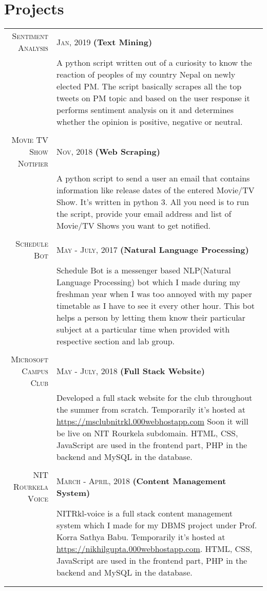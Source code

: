 \documentclass[a4paper,10pt]{article}
\begin{document}
\section{Projects}
\begin{tabular}{r|p{11cm}}

\textsc{Sentiment Analysis}&\textsc{Jan, 2019} \textbf{(Text Mining)}\\
&\footnotesize{A python script written out of a curiosity to know the reaction of peoples of my country Nepal on newly elected PM. The script basically scrapes all the top tweets on PM topic and based on the user response it performs sentiment analysis on it and determines whether the opinion is positive, negative or neutral. }\\ \\

\textsc{Movie TV Show Notifier}&\textsc{Nov, 2018} \textbf{(Web Scraping)}\\
&\footnotesize{A python script to send a user an email that contains information like release dates of the entered Movie/TV Show. It's written in python 3. All you need is to run the script, provide your email address and list of Movie/TV Shows you want to get notified. }\\ \\

\textsc{Schedule Bot}&\textsc{May - July, 2017} \textbf{(Natural Language Processing)}\\ &\footnotesize{Schedule Bot is a messenger based NLP(Natural Language Processing) bot which I made during my freshman year when I was too annoyed with my paper timetable as I have to see it every other hour. This bot helps a person by letting them know their particular subject at a particular time when provided with respective section and lab group. }\\ \\

\textsc{Microsoft Campus Club}&\textsc{May - July, 2018} \textbf{(Full Stack Website)}\\ &\footnotesize{Developed a full stack website for the club throughout the summer from scratch. Temporarily it's hosted at \url{https://msclubnitrkl.000webhostapp.com} Soon it will be live on NIT Rourkela subdomain. HTML, CSS, JavaScript are used in the frontend part, PHP in the backend and MySQL in the database. }\\ \\

\textsc{NIT Rourkela Voice}&\textsc{March - April, 2018} \textbf{(Content Management System)}\\ &\footnotesize{NITRkl-voice is a full stack content management system which I made for my DBMS project under Prof. Korra Sathya Babu. Temporarily it's hosted at \url{https://nikhilgupta.000webhostapp.com}. HTML, CSS, JavaScript are used in the frontend part, PHP in the backend and MySQL in the database.  }\\ \\


\multicolumn{2}{c}{}
\end{tabular}
\end{document}
